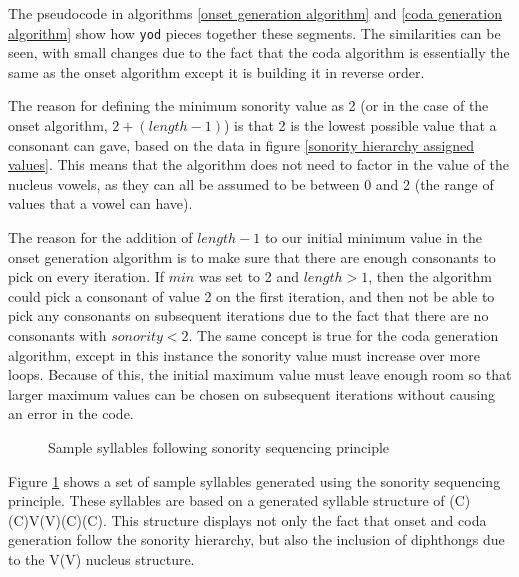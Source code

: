\documentclass{report}
\begin{document}
	The pseudocode in algorithms \ref{onset generation algorithm} and \ref{coda generation algorithm} show how \texttt{yod} pieces together these segments. The similarities can be seen, with small changes due to the fact that the coda algorithm is essentially the same as the onset algorithm except it is building it in reverse order.
	
	The reason for defining the minimum sonority value as 2 (or in the case of the onset algorithm, $2 + (length - 1)$) is that 2 is the lowest possible value that a consonant can gave, based on the data in figure \ref{sonority hierarchy assigned values}. This means that the algorithm does not need to factor in the value of the nucleus vowels, as they can all be assumed to be between 0 and 2 (the range of values that a vowel can have).
	
	The reason for the addition of $length - 1$ to our initial minimum value in the onset generation algorithm is to make sure that there are enough consonants to pick on every iteration. If $min$ was set to 2 and $length > 1$, then the algorithm could pick a consonant of value 2 on the first iteration, and then not be able to pick any consonants on subsequent iterations due to the fact that there are no consonants with $sonority < 2$. The same concept is true for the coda generation algorithm, except in this instance the sonority value must increase over more loops. Because of this, the initial maximum value must leave enough room so that larger maximum values can be chosen on subsequent iterations without causing an error in the code.
	
		
	\begin{figure}
		\caption{Sample syllables following sonority sequencing principle}
		\label{sample syllables using sonority sequencing principle}  
		\begin{tcolorbox}
		\end{tcolorbox}
	\end{figure}

	Figure \ref{sample syllables using sonority sequencing principle} shows a set of sample syllables generated using the sonority sequencing principle. These syllables are based on a generated syllable structure of (C)(C)V(V)(C)(C). This structure displays not only the fact that onset and coda generation follow the sonority hierarchy, but also the inclusion of diphthongs due to the V(V) nucleus structure.
	
\end{document}
